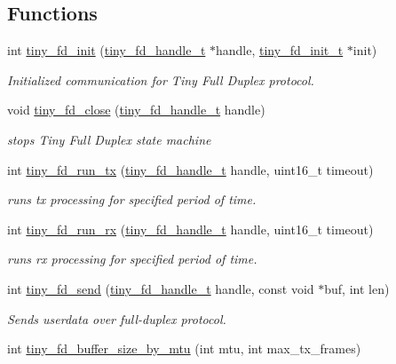 \subsection*{Functions}
\begin{DoxyCompactItemize}
\item 
int \hyperlink{group__FULL__DUPLEX__API_ga27fa59dffd1575419753beb35282bad5}{tiny\+\_\+fd\+\_\+init} (\hyperlink{group__FULL__DUPLEX__API_ga91e6b79431fe38570fb102701ef0b7e8}{tiny\+\_\+fd\+\_\+handle\+\_\+t} $\ast$handle, \hyperlink{group__FULL__DUPLEX__API_gad19ac27f4ba1d2b807e0a440b0c927d2}{tiny\+\_\+fd\+\_\+init\+\_\+t} $\ast$init)
\begin{DoxyCompactList}\small\item\em Initialized communication for Tiny Full Duplex protocol. \end{DoxyCompactList}\item 
void \hyperlink{group__FULL__DUPLEX__API_ga11e470503e3359bc29a5bcb65a9771d5}{tiny\+\_\+fd\+\_\+close} (\hyperlink{group__FULL__DUPLEX__API_ga91e6b79431fe38570fb102701ef0b7e8}{tiny\+\_\+fd\+\_\+handle\+\_\+t} handle)
\begin{DoxyCompactList}\small\item\em stops Tiny Full Duplex state machine \end{DoxyCompactList}\item 
int \hyperlink{group__FULL__DUPLEX__API_ga601c9874a570331580856c1ea28f7914}{tiny\+\_\+fd\+\_\+run\+\_\+tx} (\hyperlink{group__FULL__DUPLEX__API_ga91e6b79431fe38570fb102701ef0b7e8}{tiny\+\_\+fd\+\_\+handle\+\_\+t} handle, uint16\+\_\+t timeout)
\begin{DoxyCompactList}\small\item\em runs tx processing for specified period of time. \end{DoxyCompactList}\item 
int \hyperlink{group__FULL__DUPLEX__API_gad31f944514aef01e27bc3ec67fdbe140}{tiny\+\_\+fd\+\_\+run\+\_\+rx} (\hyperlink{group__FULL__DUPLEX__API_ga91e6b79431fe38570fb102701ef0b7e8}{tiny\+\_\+fd\+\_\+handle\+\_\+t} handle, uint16\+\_\+t timeout)
\begin{DoxyCompactList}\small\item\em runs rx processing for specified period of time. \end{DoxyCompactList}\item 
int \hyperlink{group__FULL__DUPLEX__API_ga490157ee98ea6148f99a5bb1f26c5f60}{tiny\+\_\+fd\+\_\+send} (\hyperlink{group__FULL__DUPLEX__API_ga91e6b79431fe38570fb102701ef0b7e8}{tiny\+\_\+fd\+\_\+handle\+\_\+t} handle, const void $\ast$buf, int len)
\begin{DoxyCompactList}\small\item\em Sends userdata over full-\/duplex protocol. \end{DoxyCompactList}\item 
int \hyperlink{group__FULL__DUPLEX__API_ga19789bea5b5acd68804773f0d6b0e3f7}{tiny\+\_\+fd\+\_\+buffer\+\_\+size\+\_\+by\+\_\+mtu} (int mtu, int max\+\_\+tx\+\_\+frames)
\end{DoxyCompactItemize}


